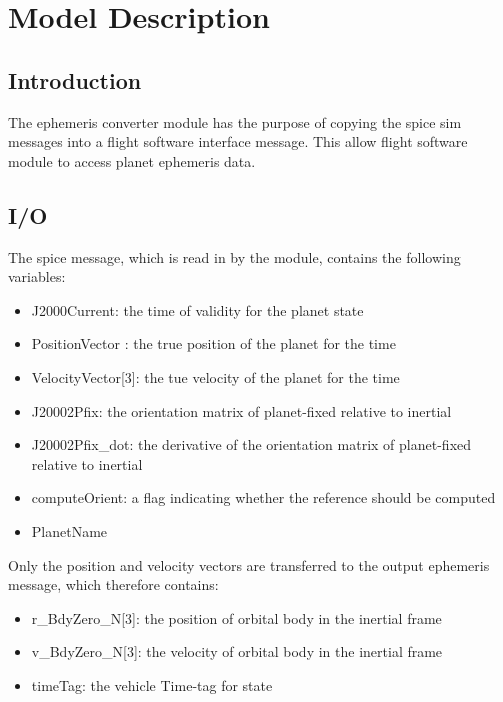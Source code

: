 \section{Model Description}

\subsection{Introduction}
The ephemeris converter module has the purpose of copying the spice sim messages into a flight software interface message. This allow flight software module to access planet ephemeris data.

\subsection{I/O}

The spice message, which is read in by the module, contains the following variables:

\begin{itemize}
\item J2000Current: the time of validity for the planet state
\item PositionVector : the true position of the planet for the time
    \item  VelocityVector[3]: the tue velocity of the planet for the time
    \item  J20002Pfix: the orientation matrix of planet-fixed relative to inertial
    \item  J20002Pfix\_dot: the derivative of the orientation matrix of planet-fixed relative to inertial
    \item  computeOrient: a flag indicating whether the reference should be computed
    \item  PlanetName
\end{itemize}

Only the position and velocity vectors are transferred to the output ephemeris message, which therefore contains:
\begin{itemize}
    \item r\_BdyZero\_N[3]: the position of orbital body in the inertial frame
    \item v\_BdyZero\_N[3]: the velocity of orbital body in the inertial frame
    \item timeTag: the vehicle Time-tag for state
\end{itemize}


